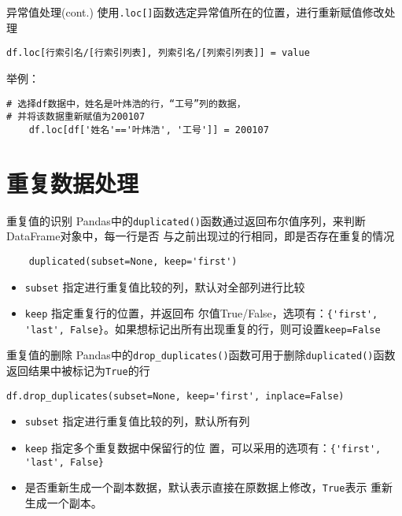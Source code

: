 \documentclass[t]{beamer}
\begin{document}
\begin{frame}[fragile]{异常值处理(cont.)}
    使用\verb|.loc[]|函数选定异常值所在的位置，进行重新赋值修改处理
\begin{lstlisting}
df.loc[行索引名/[行索引列表], 列索引名/[列索引列表]] = value
\end{lstlisting}
    
\begin{block}{举例：}
\begin{lstlisting}
# 选择df数据中，姓名是叶炜浩的行，“工号”列的数据，
# 并将该数据重新赋值为200107
    df.loc[df['姓名'=='叶炜浩', '工号']] = 200107
\end{lstlisting}
    
\end{block}
\end{frame}


\section{重复数据处理}



\begin{frame}[fragile]{重复值的识别}
Pandas中的\verb|duplicated()|函数通过返回布尔值序列，来判断DataFrame对象中，{\color{red}每一行}是否
与之前出现过的行相同，即是否存在重复的情况

\begin{lstlisting}
    duplicated(subset=None, keep='first')
\end{lstlisting}

\begin{itemize}
    \item \verb|subset| 指定进行重复值比较的列，默认对全部列进行比较
    \item \verb|keep| 指定重复行的位置，并返回布
    尔值True/False，选项有：\verb|{'first', 'last', False}|。如果想标记出所有出现重复的行，则可设置\verb|keep=False|
\end{itemize}

\end{frame}

\begin{frame}[fragile]{重复值的删除}
Pandas中的\verb|drop_duplicates()|函数可用于删除\verb|duplicated()|函数返回结果中被标记为\verb|True|的行
\begin{lstlisting}
df.drop_duplicates(subset=None, keep='first', inplace=False)
\end{lstlisting}
\begin{itemize}
    \item \verb|subset| 指定进行重复值比较的列，默认所有列
    \item \verb|keep| 指定多个重复数据中{\color{red}保留}行的位
    置，可以采用的选项有：\verb|{'first', 'last', False}|
    \item 是否重新生成一个副本数据，默认表示直接在原数据上修改，\verb|True|表示
    重新生成一个副本。
\end{itemize}
    
\end{frame}
\end{document}

